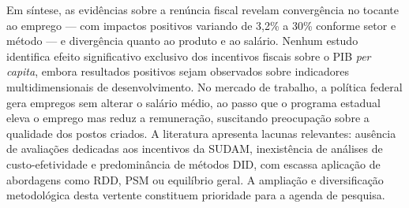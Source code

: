 Em síntese, as evidências sobre a renúncia fiscal revelam convergência no tocante ao emprego --- com impactos positivos variando de 3,2\% a 30\% conforme setor e método --- e divergência quanto ao produto e ao salário. Nenhum estudo identifica efeito significativo exclusivo dos incentivos fiscais sobre o PIB \textit{per capita}, embora resultados positivos sejam observados sobre indicadores multidimensionais de desenvolvimento. No mercado de trabalho, a política federal gera empregos sem alterar o salário médio, ao passo que o programa estadual eleva o emprego mas reduz a remuneração, suscitando preocupação sobre a qualidade dos postos criados. A literatura apresenta lacunas relevantes: ausência de avaliações dedicadas aos incentivos da SUDAM, inexistência de análises de custo-efetividade e predominância de métodos DID, com escassa aplicação de abordagens como RDD, PSM ou equilíbrio geral. A ampliação e diversificação metodológica desta vertente constituem prioridade para a agenda de pesquisa.

